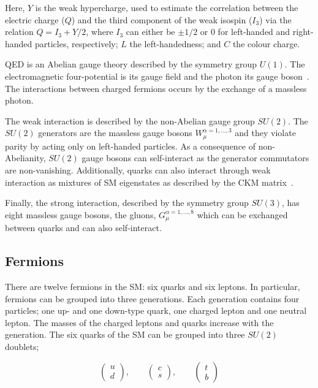 			\noindent Here, $Y$ is the weak hypercharge, used to estimate the correlation between the electric charge ($Q$) and the third component of the weak isospin ($I_3$) via the relation $Q = I_3 + Y/2$, where $I_3$ can either be $\pm 1/2$ or $0$ for left-handed and right-handed particles, respectively; $L$ the left-handedness; and $C$ the colour charge. 


			\ac{QED} is an Abelian gauge theory described by the symmetry group $U(1)$. The electromagnetic four-potential is its gauge field and the photon its gauge boson~\cite{Pich2012}. The interactions between charged fermions occurs by the exchange of a massless photon. 

			The weak interaction is described by the non-Abelian gauge group $SU(2)$. The $SU(2)$ generators are the massless gauge bosons $W_{\mu}^{\alpha = 1,\dots,3}$ and they violate parity by acting only on left-handed particles. As a consequence of non-Abelianity, $SU(2)$ gauge bosons can self-interact as the generator commutators are non-vanishing. Additionally, quarks can also interact through weak interaction as mixtures of \ac{SM} eigenstates as described by the CKM matrix~\cite{Olive2014}.

			Finally, the strong interaction, described by the symmetry group $SU(3)$, has eight massless gauge bosons, the gluons, $G_{\mu}^{\alpha=1,\dots,8}$ which can be exchanged between quarks and can also self-interact. 



		\subsection*{Fermions}

			There are twelve fermions in the \ac{SM}: six quarks and six leptons. In particular, fermions can be grouped into three generations. Each generation contains four particles; one up- and one down-type quark, one charged lepton and one neutral lepton. The masses of the charged leptons and quarks increase with the generation. The six quarks of the \ac{SM} can be grouped into three $SU(2)$ doublets;

			\begin{equation*}
			\label{eq:quark_doublets}
				\begin{pmatrix} u \\ d \end{pmatrix}, \qquad 
				\begin{pmatrix} c \\ s \end{pmatrix}, \qquad 
				\begin{pmatrix} t \\ b \end{pmatrix}
			\end{equation*}

